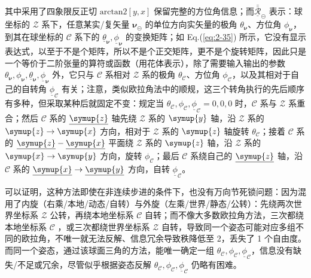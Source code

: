 其中采用了四象限反正切 $\text{arctan2} \left[ y,x \right]$ 保留完整的方位角信息；而$\bar{\bar{\underline{\mathcal{R}}}}_{\circleddash}$ 表示：球坐标的 $\mathcal{Z}$ 系下，任意某实/复矢量 $\symbf{\nu}_{\circleddash}$ 的单位方向实矢量的极角 $\theta_{\symbf{\nu}}$、方位角 $\phi_{\symbf{\nu}}$，到其在球坐标的 $\mathcal{C}$ 系下的 $\underline{\theta}_{\symbf{\nu}}, \underline{\phi}_{\symbf{\nu}}$ 的变换矩阵；如 Eq.(\ref{eq:2-35}) 所示，它没有显示表达式，以至于不是个矩阵，所以不是个正交矩阵，更不是个旋转矩阵，因此只是一个等价于二阶张量的算符或函数（用花体表示），除了需要输入输出的参数 $\theta_{\symbf{\nu}}, \phi_{\symbf{\nu}}, \underline{\theta}_{\symbf{\nu}}, \underline{\phi}_{\symbf{\nu}}$ 外，它只与 $\mathcal{C}$ 系相对 $\mathcal{Z}$ 系的极角 $\theta_{\mathcal{C}}$、方位角 $\phi_{\mathcal{C}}$，以及其相对于自己的自转角 $\underline{\phi}_{\mathcal{C}}$ 有关；注意，类似欧拉角法中的顺规，这三个转角执行的先后顺序有多种，但采取某种后就固定不变：规定当 $\theta_{\mathcal{C}},\phi_{\mathcal{C}},\underline{\phi}_{\mathcal{C}} = 0,0,0$ 时，$\mathcal{C}$ 系与 $\mathcal{Z}$ 系重合；然后 $\mathcal{C}$ 系的 $\underline{\symup{z}}$ 轴先绕 $\mathcal{Z}$ 系的 $\symup{y}$ 轴，沿 $\mathcal{Z}$ 系的 $\symup{z} \rightarrow \symup{x}$ 方向，相对于 $\mathcal{Z}$ 系的 $\symup{z}$ 轴旋转 $\theta_{\mathcal{C}}$；接着 $\mathcal{C}$ 系的 $\underline{\symup{z}} - \underline{\symup{x}}$ 平面绕 $\mathcal{Z}$ 系的 $\symup{z}$ 轴，沿 $\mathcal{Z}$ 系的 $\symup{x} \rightarrow \symup{y}$ 方向，旋转 $\phi_{\mathcal{C}}$；最后 $\mathcal{C}$ 系绕自己的 $\underline{\symup{z}}$ 轴，沿 $\mathcal{C}$ 系的 $\underline{\symup{x}} \rightarrow \underline{\symup{y}}$ 方向，自转 $\underline{\phi}_{\mathcal{C}}$。

可以证明，这种方法即使在非连续步进的条件下，也没有万向节死锁问题：因为混用了内旋（右乘/本地/动态/自转）与外旋（左乘/世界/静态/公转）：先绕两次世界坐标系 $\mathcal{Z}$ 公转，再绕本地坐标系 $\mathcal{C}$ 自转；而不像大多数欧拉角方法，三次都绕本地坐标系 $\mathcal{C}$ ，或三次都绕世界坐标系 $\mathcal{Z}$ 自转，导致同一个姿态可能对应多组不同的欧拉角，不唯一就无法反解、信息冗余导致秩降低至 2，丢失了 1 个自由度。而同一个姿态，通过该球面三角的方法，能唯一确定一组 $\theta_{\mathcal{C}},\phi_{\mathcal{C}},\underline{\phi}_{\mathcal{C}}$，信息没有缺失/不足或冗余，尽管似乎根据姿态反解 $\theta_{\mathcal{C}},\phi_{\mathcal{C}},\underline{\phi}_{\mathcal{C}}$ 仍略有困难。

